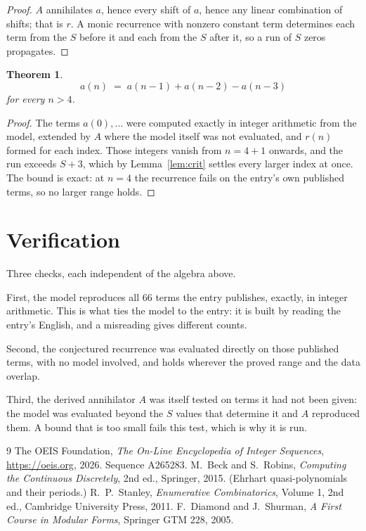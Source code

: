 \documentclass[11pt,a4paper]{article}
\theoremstyle{plain}
\newtheorem{theorem}{Theorem}
\theoremstyle{definition}
\begin{document}
\begin{proof}
$A$ annihilates $a$, hence every shift of $a$, hence any linear combination of shifts; that is
$r$. A monic recurrence with nonzero constant term determines each term from the $S$ before it
and each from the $S$ after it, so a run of $S$ zeros propagates.
\end{proof}

\begin{theorem}
\[
a(n)\;=\;a(n-1) + a(n-2) - a(n-3)
\]
for every $n>4$.
\end{theorem}

\begin{proof}
The terms $a(0),\dots$ were computed exactly in integer arithmetic from the model, extended by
$A$ where the model itself was not evaluated, and $r(n)$ formed for each index. Those integers
vanish from $n=4+1$ onwards, and the run exceeds $S+3$, which by
Lemma~\ref{lem:crit} settles every larger index at once. The bound is exact: at $n=4$ the recurrence fails on the entry's own published terms, so no larger range holds.
\end{proof}

\section{Verification}

Three checks, each independent of the algebra above.

First, the model reproduces all $66$ terms the entry publishes, exactly, in integer
arithmetic. This is what ties the model to the entry: it is built by reading the entry's
English, and a misreading gives different counts.

Second, the conjectured recurrence was evaluated directly on those published terms, with no
model involved, and holds wherever the proved range and the data overlap.

Third, the derived annihilator $A$ was itself tested on terms it had not been given: the model
was evaluated beyond the $S$ values that determine it and $A$ reproduced them. A bound that is
too small fails this test, which is why it is run.

\begin{thebibliography}{9}
 The OEIS Foundation, \emph{The On-Line Encyclopedia of Integer
Sequences}, \url{https://oeis.org}, 2026. Sequence A265283.
 M.~Beck and S.~Robins, \emph{Computing the Continuous Discretely},
2nd ed., Springer, 2015. (Ehrhart quasi-polynomials and their periods.)
 R.~P.~Stanley, \emph{Enumerative Combinatorics}, Volume 1, 2nd ed.,
Cambridge University Press, 2011.
 F.~Diamond and J.~Shurman, \emph{A First Course in Modular Forms},
Springer GTM 228, 2005.
\end{thebibliography}
\end{document}
